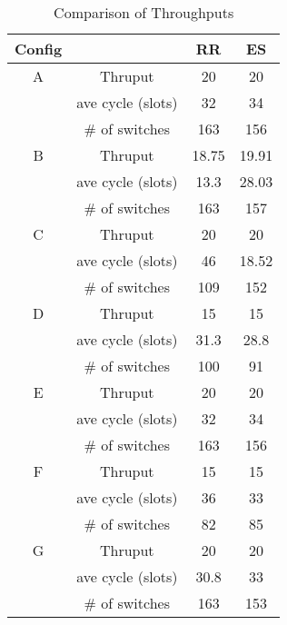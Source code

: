 \documentclass[12 pt]{article}
\newcommand{\debug}[1]{\mbox{\tt #1}}
\renewcommand{\debug}[1]{}              \newcommand{\cmd}[1]{}
\newcommand{\2}{\>\>}
\newcommand{\3}{\>\>\>}
\newcommand{\4}{\>\>\>\>}
\newcommand{\5}{\>\>\>\>\>}
\newcommand{\6}{\>\>\>\>\>\>}
\newcommand{\7}{\6\>}
\newcommand{\8}{\6\2}
\newcounter{protblock}
\newcounter{line}[protblock]
\begin{document}
\begin{table}[hbtp]
\begin{center}
\begin{tabular}{|c|c|c|c|}
  \hline
Config  &                     & RR        & ES        \\ \hline
  A & Thruput                      & 20        & 20        \\ \cline{2-4}
    & ave cycle (slots)             & 32        & 34        \\ \cline{2-4}
    & $\#$ of switches             & 163       & 156        \\ \hline
  B & Thruput                      & 18.75     & 19.91      \\ \cline{2-4}
    & ave cycle (slots)             & 13.3      & 28.03      \\ \cline{2-4}
    & $\#$ of switches              & 163       & 157        \\  \hline
  C & Thruput                    & 20        & 20         \\ \cline{2-4}
    & ave cycle (slots)          & 46        & 18.52      \\ \cline{2-4}
    & $\#$ of switches           & 109       & 152        \\  \hline
  D & Thruput                       & 15        & 15        \\ \cline{2-4}
    & ave cycle (slots)          & 31.3      & 28.8      \\ \cline{2-4}
    & $\#$ of switches                & 100       & 91        \\  \hline
  E & Thruput                      & 20        & 20      \\ \cline{2-4}
    & ave cycle (slots)           & 32        & 34      \\ \cline{2-4}
    & $\#$ of switches              & 163       & 156        \\  \hline
  F & Thruput                     & 15        & 15      \\ \cline{2-4}
    & ave cycle (slots)          & 36        & 33      \\ \cline{2-4}
    & $\#$ of switches            & 82        & 85        \\  \hline
  G & Thruput                     & 20        & 20      \\ \cline{2-4}
    & ave cycle (slots)          & 30.8      & 33      \\ \cline{2-4}
    & $\#$ of switches            & 163       & 153        \\  \hline
\end{tabular}
\caption{Comparison of Throughputs\debug{\fbox{Table-Results}}\label{Table-Results}}
\end{center}
\end{table}
\end{document}
